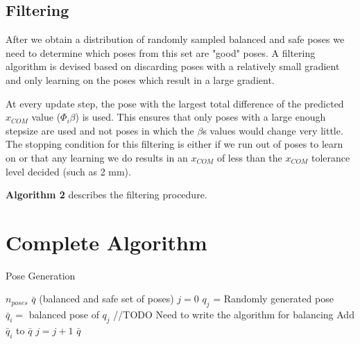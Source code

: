 \documentclass[letterpaper, 10pt, conference]{ieeeconf}
\begin{document}
\subsection{Filtering}
After we obtain a distribution of randomly sampled balanced and safe poses we
need to determine which poses from this set are "good" poses. A filtering
algorithm is devised based on discarding poses with a relatively small gradient
and only learning on the poses which result in a large gradient.

At every update step, the pose with the largest total difference of the predicted
$x_{COM}$ value ($\Phi_i \beta$) is used. This ensures that only poses with a
large enough stepsize are used and not poses in which the $\beta$s values would
change very little. The stopping condition for this filtering is either if we
run out of poses to learn on or that any learning we do results in an $x_{COM}$
of less than the $x_{COM}$ tolerance level decided (such as 2 mm).

\textbf{Algorithm 2} describes the filtering procedure.

\section{Complete Algorithm}


\begin{algorithm}
    \caption{Pose Generation}
    \begin{algorithmic}[1]
        \renewcommand{\algorithmicrequire}{\textbf{Input:}}
        \renewcommand{\algorithmicensure}{\textbf{Output:}}
        \REQUIRE $n_{poses}$
        \ENSURE  $\bar{q} $ (balanced and safe set of poses)
        \STATE $j = 0$
        \STATE $q_j $ = Randomly generated pose
        \STATE $\bar{q}_i =$ balanced pose of $q_j$
        \STATE //TODO Need to write the algorithm for balancing
        \STATE Add $\bar{q}_i $ to $\bar{q}$
        \ENDIF
        \STATE $ j = j + 1 $
        \ENDWHILE
        \RETURN $\bar{q}$
    \end{algorithmic}
\end{algorithm}
\end{document}
